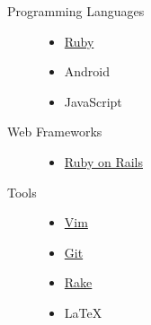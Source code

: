 \begin{description}
  \item[Programming Languages] \hfill
    \begin{itemize}
      \item \href{https://www.ruby-lang.org/}{Ruby}
      \item Android
      \item JavaScript
    \end{itemize}
  \item[Web Frameworks] \hfill
    \begin{itemize}
      \item \href{http://rubyonrails.org}{Ruby on Rails}
    \end{itemize}
  \item[Tools] \hfill
    \begin{itemize}
      \item \href{http://www.vim.org}{Vim}
      \item \href{http://git-scm.com}{Git}
      \item \href{https://github.com/ruby/rake}{Rake}
      \item {\fb\LaTeX}\setmainfont[SmallCapsFont=Fontin-SmallCaps.otf]{Fontin.otf}
    \end{itemize}
\end{description}

